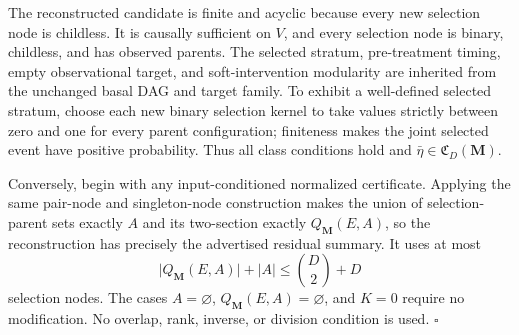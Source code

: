 The reconstructed candidate is finite and acyclic because every new selection node is childless.  It is causally sufficient on \(V\), and every selection node is binary, childless, and has observed parents.  The selected stratum, pre-treatment timing, empty observational target, and soft-intervention modularity are inherited from the unchanged basal DAG and target family.  To exhibit a well-defined selected stratum, choose each new binary selection kernel to take values strictly between zero and one for every parent configuration; finiteness makes the joint selected event have positive probability.  Thus all class conditions hold and \(\bar\eta\in\mathfrak C_D(\mathbf M)\).

Conversely, begin with any input-conditioned normalized certificate.  Applying the same pair-node and singleton-node construction makes the union of selection-parent sets exactly \(A\) and its two-section exactly \(Q_{\mathbf M}(E,A)\), so the reconstruction has precisely the advertised residual summary.  It uses at most
\[
\lvert Q_{\mathbf M}(E,A)\rvert+\lvert A\rvert
\le \binom D2+D
\]
selection nodes.  The cases \(A=\varnothing\), \(Q_{\mathbf M}(E,A)=\varnothing\), and \(K=0\) require no modification.  No overlap, rank, inverse, or division condition is used. \(\square\)